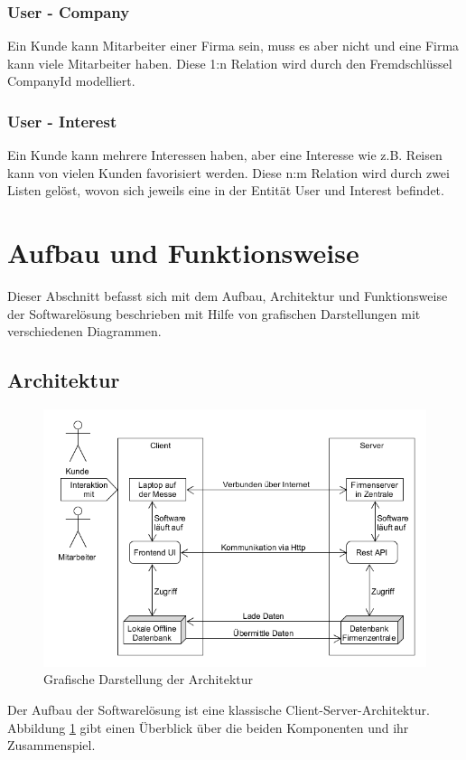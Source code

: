 \subsubsection{User - Company}
Ein Kunde kann Mitarbeiter einer Firma sein, muss es aber nicht und eine Firma kann viele Mitarbeiter haben. Diese 1:n Relation wird durch den Fremdschlüssel CompanyId modelliert.

\subsubsection{User - Interest}
Ein Kunde kann mehrere Interessen haben, aber eine Interesse wie z.B. Reisen kann von vielen Kunden favorisiert werden. Diese n:m Relation wird durch zwei Listen gelöst, wovon sich jeweils eine in der Entität User und Interest befindet.

\newpage
\section{Aufbau und Funktionsweise}
Dieser Abschnitt befasst sich mit dem Aufbau, Architektur und Funktionsweise der Softwarelösung beschrieben mit Hilfe von grafischen Darstellungen mit verschiedenen Diagrammen.

\subsection{Architektur}
\begin{figure}[h]
	\centering
	\includegraphics[width=0.8\linewidth]{Images/Projekt_Messe_Architektur}
	\caption{Grafische Darstellung der Architektur}
	\label{fig:projektmessearchitektur}
\end{figure}
Der Aufbau der Softwarelösung ist eine klassische Client-Server-Architektur. Abbildung \ref{fig:projektmessearchitektur} gibt einen Überblick über die beiden Komponenten und ihr Zusammenspiel. 

